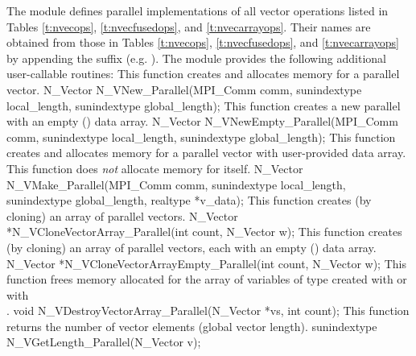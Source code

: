 The {\nvecp} module defines parallel implementations of all vector operations listed 
in Tables \ref{t:nvecops}, \ref{t:nvecfusedops}, and \ref{t:nvecarrayops}. Their names
are obtained from those in Tables \ref{t:nvecops}, \ref{t:nvecfusedops}, and
\ref{t:nvecarrayops} by appending the suffix 
(e.g. ).
The module {\nvecp} provides the following additional
user-callable routines:
{
  This function creates and allocates memory for a parallel vector.
}
{
  N\_Vector N\_VNew\_Parallel(MPI\_Comm comm, sunindextype
  local\_length,
  sunindextype global\_length);
}
{
  This function creates a new parallel  with an empty
  () data array.
}
{
  N\_Vector N\_VNewEmpty\_Parallel(MPI\_Comm comm, sunindextype
  local\_length,
  sunindextype global\_length);
}
{
  This function creates and allocates memory for a parallel vector
  with user-provided data array. This function does {\em not} allocate memory
  for  itself.
}
{
  N\_Vector N\_VMake\_Parallel(MPI\_Comm comm, 
  sunindextype local\_length,
  sunindextype global\_length,
  realtype *v\_data);
}
{
  This function creates (by cloning) an array of  parallel vectors.
}
{
  N\_Vector *N\_VCloneVectorArray\_Parallel(int count, N\_Vector w);
}
{
  This function creates (by cloning) an array of  parallel vectors,
  each with an empty () data array.
}
{
  N\_Vector *N\_VCloneVectorArrayEmpty\_Parallel(int count, N\_Vector w);
}
{
  This function frees memory allocated for the array of   variables of
  type  created with  or with \\
  .
}
{
  void N\_VDestroyVectorArray\_Parallel(N\_Vector *vs, int count);
}
{
  This function returns the number of vector elements (global vector length).
}
{
  sunindextype N\_VGetLength\_Parallel(N\_Vector v);
}
